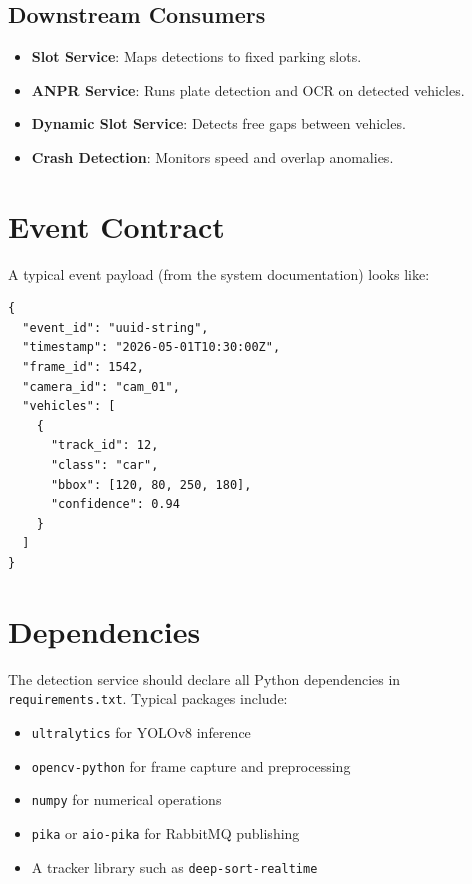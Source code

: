 \documentclass[11pt]{article}
\begin{document}
\subsection*{Downstream Consumers}
\begin{itemize}
  \item \textbf{Slot Service}: Maps detections to fixed parking slots.
  \item \textbf{ANPR Service}: Runs plate detection and OCR on detected vehicles.
  \item \textbf{Dynamic Slot Service}: Detects free gaps between vehicles.
  \item \textbf{Crash Detection}: Monitors speed and overlap anomalies.
\end{itemize}

\section{Event Contract}
A typical event payload (from the system documentation) looks like:

\begin{lstlisting}[basicstyle=\ttfamily\small]
{
  "event_id": "uuid-string",
  "timestamp": "2026-05-01T10:30:00Z",
  "frame_id": 1542,
  "camera_id": "cam_01",
  "vehicles": [
    {
      "track_id": 12,
      "class": "car",
      "bbox": [120, 80, 250, 180],
      "confidence": 0.94
    }
  ]
}
\end{lstlisting}

\section{Dependencies}
The detection service should declare all Python dependencies in \texttt{requirements.txt}. Typical packages include:

\begin{itemize}
  \item \texttt{ultralytics} for YOLOv8 inference
  \item \texttt{opencv-python} for frame capture and preprocessing
  \item \texttt{numpy} for numerical operations
  \item \texttt{pika} or \texttt{aio-pika} for RabbitMQ publishing
  \item A tracker library such as \texttt{deep-sort-realtime}
\end{itemize}
\end{document}
